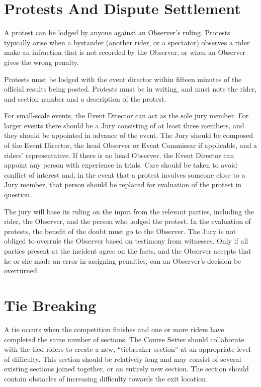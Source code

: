 \section{Protests And Dispute Settlement}
A protest can be lodged by anyone against an Observer's ruling. 
Protests typically arise when a bystander (another rider, or a spectator) observes a rider make an infraction that is not recorded by the Observer, or when an Observer gives the wrong penalty.

Protests must be lodged with the event director within fifteen minutes of the official results being posted. 
Protests must be in writing, and must note the rider, and section number and a description of the protest.

For small-scale events, the Event Director can act as the sole jury member. 
For larger events there should be a Jury consisting of at least three members, and they should be appointed in advance of the event. 
The Jury should be composed of the Event Director, the head Observer or Event Commissar if applicable, and a riders' representative. 
If there is no head Observer, the Event Director can appoint any person with experience in trials. 
Care should be taken to avoid conflict of interest and, in the event that a protest involves someone close to a Jury member, that person should be replaced for evaluation of the protest in question.

The jury will base its ruling on the input from the relevant parties, including the rider, the Observer, and the person who
lodged the protest. 
In the evaluation of protests, the benefit of the doubt must go to the Observer. 
The Jury is not obliged to overrule the Observer based on testimony from witnesses. 
Only if all parties present at the incident agree on the facts, and the Observer accepts that he or she made an error in assigning penalties, can an Observer's decision be overturned.

\section{Tie Breaking}
A tie occurs when the competition finishes and one or more riders have completed the same number of sections.
The Course Setter should collaborate with the tied riders to create a new, “tiebreaker section” at an appropriate level of difficulty. 
This section should be relatively long and may consist of several existing sections joined together, or an entirely new section.
The section should contain obstacles of increasing difficulty towards the exit location.

